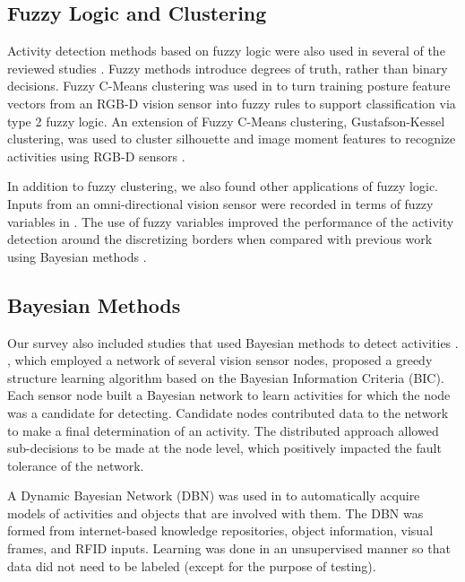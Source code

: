 \documentclass[12pt]{report}
\begin{document}
\subsection{Fuzzy Logic and Clustering}

Activity detection methods based on fuzzy logic were also used in several of the reviewed studies \cite{Banerjee2014, Seki2009, Yao2016, Akbari2017}. Fuzzy methods introduce degrees of truth, rather than binary decisions. Fuzzy C-Means clustering was used in \cite{Yao2016} to turn training posture feature vectors from an RGB-D vision sensor into fuzzy rules to support classification via type 2 fuzzy logic. An extension of Fuzzy C-Means clustering, Gustafson-Kessel clustering, was used to cluster silhouette and image moment features to recognize activities using RGB-D sensors \cite{Banerjee2014}.

In addition to fuzzy clustering, we also found other applications of fuzzy logic. Inputs from an omni-directional vision sensor were recorded in terms of fuzzy variables in \cite{Seki2009}. The use of fuzzy variables improved the performance of the activity detection around the discretizing borders when compared with previous work using Bayesian methods \cite{HirokazuSeki2008}.

\subsection{Bayesian Methods}

Our survey also included studies that used Bayesian methods to detect activities \cite{McIlwraith2009, Yoshida2010, Wu2007}. \cite{McIlwraith2009}, which employed a network of several vision sensor nodes, proposed a greedy structure learning algorithm based on the Bayesian Information Criteria (BIC). Each sensor node built a Bayesian network to learn activities for which the node was a candidate for detecting. Candidate nodes contributed data to the network to make a final determination of an activity. The distributed approach allowed sub-decisions to be made at the node level, which positively impacted the fault tolerance of the network.

A Dynamic Bayesian Network (DBN) was used in \cite{Wu2007} to automatically acquire models of activities and objects that are involved with them. The DBN was formed from internet-based knowledge repositories, object information, visual frames, and RFID inputs. Learning was done in an unsupervised manner so that data did not need to be labeled (except for the purpose of testing).
\end{document}
